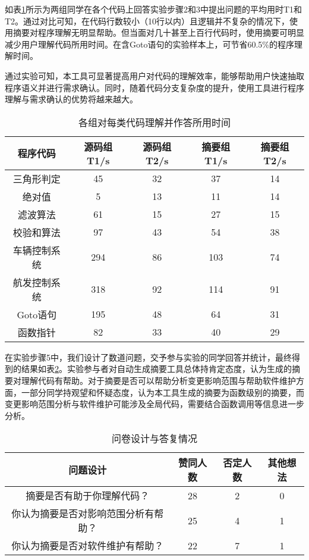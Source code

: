 如表\ref{tab:ComprehensionComparision}所示为两组同学在各个代码上回答实验步骤2和3中提出问题的平均用时T1和T2。通过对比可知，在代码行数较小（10行以内）且逻辑并不复杂的情况下，使用摘要对程序理解无明显帮助。但当面对几十甚至上百行代码时，使用摘要可明显减少用户理解代码所用时间。在含Goto语句的实验样本上，可节省60.5\%的程序理解时间。

通过实验可知，本工具可显著提高用户对代码的理解效率，能够帮助用户快速抽取程序语义并进行需求确认。同时，随着代码分支复杂度的提升，使用工具进行程序理解与需求确认的优势将越来越大。

\begin{table}[htb]
	\centering
	\caption{各组对每类代码理解并作答所用时间}
	\label{tab:ComprehensionComparision}
	\begin{tabular}{|c|c|c|c|c|}
		\hline
		程序代码 & 源码组T1/s & 源码组T2/s & 摘要组T1/s & 摘要组T2/s \\ \hline
		三角形判定 & 45 & 32 & 37 & 14 \\ \hline
		绝对值 & 5 & 13 & 11 & 14 \\ \hline
		滤波算法 & 61 & 15 & 27 & 15 \\ \hline
		校验和算法 & 97 & 43 & 54 & 38 \\ \hline
		车辆控制系统 & 294 & 86 & 103 & 74 \\ \hline
		航发控制系统 & 318 & 92 & 114 & 91 \\ \hline
		Goto语句 & 195 & 48 & 64 & 31 \\ \hline
		函数指针 & 82 & 33 & 40 & 29 \\ \hline
	\end{tabular}
\end{table}

在实验步骤5中，我们设计了数道问题，交予参与实验的同学回答并统计，最终得到的结果如表\ref{tab:questionaire}。实验参与者对自动生成摘要工具总体持肯定态度，认为生成的摘要对理解代码有帮助。对于摘要是否可以帮助分析变更影响范围与帮助软件维护方面，一部分同学持观望和怀疑态度，认为本工具生成的摘要为函数级别的摘要，而变更影响范围分析与软件维护可能涉及全局代码，需要结合函数调用等信息进一步分析。

\begin{table}[htb]
	\centering
	\caption{问卷设计与答复情况}
	\label{tab:questionaire}
	\begin{tabular}{|c|c|c|c|}
		\hline
		问题设计 & 赞同人数 & 否定人数 & 其他想法 \\ \hline
		摘要是否有助于你理解代码？ & 28 & 2 & 0 \\ \hline
		你认为摘要是否对影响范围分析有帮助？ & 25 & 4 & 1 \\ \hline
		你认为摘要是否对软件维护有帮助？ & 22 & 7 & 1 \\ \hline
	\end{tabular}
\end{table}

